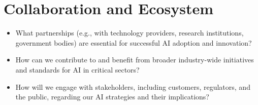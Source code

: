 \section*{Collaboration and Ecosystem}
\begin{itemize}
    \item What partnerships (e.g., with technology providers, research institutions, government bodies) are essential for successful AI adoption and innovation?
    \item How can we contribute to and benefit from broader industry-wide initiatives and standards for AI in critical sectors?
    \item How will we engage with stakeholders, including customers, regulators, and the public, regarding our AI strategies and their implications?
\end{itemize}